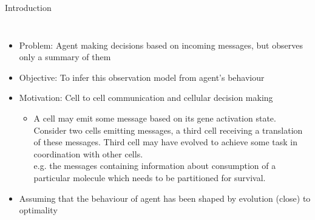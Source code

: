 \documentclass[
english,%
aspectratio=169,%
color={accentcolor=3b},
logo=true,%
colorframetitle=false,%
]{tudabeamer}
\begin{document}
\begin{frame}{Introduction}
\begin{columns}[onlytextwidth,c]
	\begin{itemize}
		\item Problem: Agent making decisions based on incoming messages, but observes only a summary of them
		\item Objective: To infer this observation model from agent's behaviour
		\item Motivation: Cell to cell communication and cellular decision making \cite{Perkins2009a}
		\begin{itemize}
			\item A cell may emit some message based on its gene activation state. Consider two cells emitting messages, a third cell receiving a translation of these messages. Third cell may have evolved to achieve some task in coordination with other cells.\\
			e.g. the messages containing information about consumption of a particular molecule which needs to be partitioned for survival.
		\end{itemize}
		\item Assuming that the behaviour of agent has been shaped by evolution (close) to optimality
	\end{itemize}
	\centering
\end{columns}
\end{frame}
\end{document}
